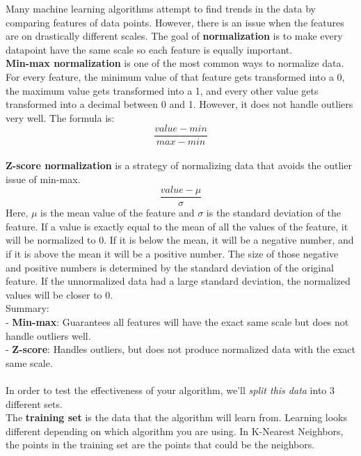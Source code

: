 \documentclass[11pt, a4paper]{article}
\begin{document}
\begin{spacing}{1.1}
	\noindent Many machine learning algorithms attempt to find trends in the data by comparing features of data points. However, there is an issue when the features are on drastically different scales. The goal of \textbf{normalization} is to make every datapoint have the same scale so each feature is equally important. \vspace*{1.5mm} \\ 
	\textbf{Min-max normalization} is one of the most common ways to normalize data. For every feature, the minimum value of that feature gets transformed into a 0, the maximum value gets transformed into a 1, and every other value gets transformed into a decimal between 0 and 1. However, it does not handle outliers very well. The formula is: $$ \frac{value - min}{max - min} $$ \\
	\textbf{Z-score normalization} is a strategy of normalizing data that avoids the outlier issue of min-max. $$ \frac{value - \mu}{\sigma} $$ Here, $\mu$ is the mean value of the feature and $\sigma$ is the standard deviation of the feature. If a value is exactly equal to the mean of all the values of the feature, it will be normalized to 0. If it is below the mean, it will be a negative number, and if it is above the mean it will be a positive number. The size of those negative and positive numbers is determined by the standard deviation of the original feature. If the unnormalized data had a large standard deviation, the normalized values will be closer to 0. \vspace*{1.5mm} \\
	Summary: \\
	\hspace*{2mm} - \textbf{Min-max}: Guarantees all features will have the exact same scale but does not handle outliers well. \\
	\hspace*{2mm} - \textbf{Z-score}: Handles outliers, but does not produce normalized data with the exact same scale. \\~\\
	In order to test the effectiveness of your algorithm, we’ll \textit{split this data} into 3 different sets. \vspace*{1.5mm} \\
	The \textbf{training set} is the data that the algorithm will learn from. Learning looks different depending on which algorithm you are using. In K-Nearest Neighbors, the points in the training set are the points that could be the neighbors. \vspace*{1.5mm} \\

\end{spacing}
\end{document}

